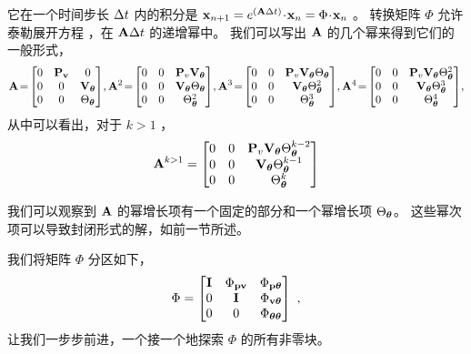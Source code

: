 它在一个时间步长 $\Delta t$ 内的积分是 ${\bf x}_{n+1}= e^{({\bf A}\Delta t)}\!\cdot\!{\bf x}_n=\Phi\!\cdot\!{\bf x}_n$ 。
转换矩阵 $\Phi$ 允许泰勒展开方程 ，在 ${\bf A}\Delta t$ 的递增幂中。
我们可以写出 ${\bf A}$ 的几个幂来得到它们的一般形式，
%
\begin{equation}
\bfA \!=\! \begin{bmatrix}
0 & \bfP_\bfv & 0 \\
0 & 0 & \bfV_\bftheta \\
0 & 0 & \Theta_\bftheta
\end{bmatrix}
\!,
\bfA^2 \!=\! 
\begin{bmatrix} 
0 & 0 & \bfP_v\bfV_\bftheta \\ 
0 & 0 & \bfV_\bftheta\Theta_\bftheta \\
0 & 0 & \Theta_\bftheta^2
\end{bmatrix}
\!,
\bfA^3 \!=\! 
\begin{bmatrix} 
0 & 0 & \bfP_v\bfV_\bftheta\Theta_\bftheta \\ 
0 & 0 & \bfV_\bftheta\Theta_\bftheta^2 \\
0 & 0 & \Theta_\bftheta^3
\end{bmatrix}
\!,
\bfA^4 \!=\! 
\begin{bmatrix} 
0 & 0 & \bfP_v\bfV_\bftheta\Theta_\bftheta^2 \\ 
0 & 0 & \bfV_\bftheta\Theta_\bftheta^3 \\
0 & 0 & \Theta_\bftheta^4
\end{bmatrix}
\!,
\end{equation}
%
从中可以看出，对于 $k>1$ ，
%
\begin{equation}
{\bf A}^{k>1} = 
\begin{bmatrix} 
0 & 0 & {\bf P}_v{\bf V}_{\bm \theta}\Theta_{\bm \theta}^{k-2} \\ 
0 & 0 & {\bf V}_{\bm \theta}\Theta_{\bm \theta}^{k-1} \\
0 & 0 & \Theta_{\bm \theta}^k
\end{bmatrix}
\end{equation}

我们可以观察到 ${\bf A}$ 的幂增长项有一个固定的部分和一个幂增长项 $\Theta_{\bm \theta}$。
这些幂次项可以导致封闭形式的解，如前一节所述。 


我们将矩阵 $\Phi$ 分区如下，
%
\begin{equation}
\Phi = \begin{bmatrix}
{\bf I} & \Phi_{{\bf p}{\bf v}} & \Phi_{{\bf p}{\bm \theta}} \\
0 & {\bf I} & \Phi_{{\bf v}{\bm \theta}} \\
0 & 0 & \Phi_{{\bm \theta}{\bm \theta}}
\end{bmatrix}~,
\end{equation}
%
让我们一步步前进，一个接一个地探索 $\Phi$ 的所有非零块。 

